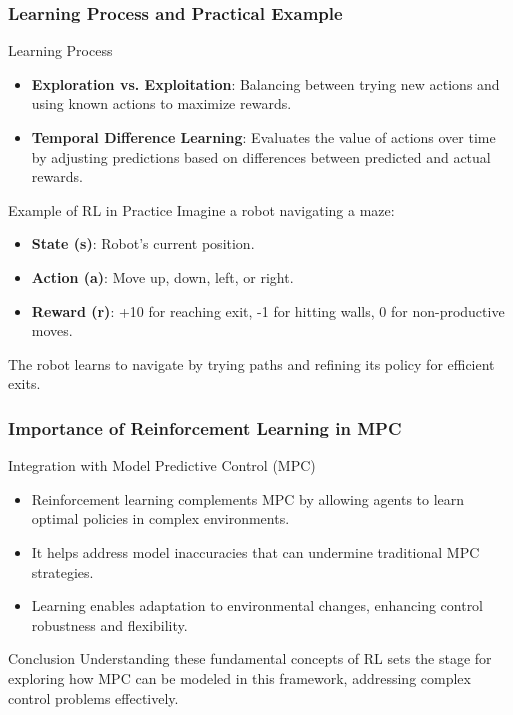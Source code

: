 \documentclass[aspectratio=169]{beamer}
\begin{document}
\begin{frame}[fragile]
    \frametitle{Learning Process and Practical Example}
    \begin{block}{Learning Process}
        \begin{itemize}
            \item \textbf{Exploration vs. Exploitation}: Balancing between trying new actions and using known actions to maximize rewards.
            \item \textbf{Temporal Difference Learning}: Evaluates the value of actions over time by adjusting predictions based on differences between predicted and actual rewards.
        \end{itemize}
    \end{block}

    \begin{block}{Example of RL in Practice}
        Imagine a robot navigating a maze:
        \begin{itemize}
            \item \textbf{State (s)}: Robot's current position.
            \item \textbf{Action (a)}: Move up, down, left, or right.
            \item \textbf{Reward (r)}: +10 for reaching exit, -1 for hitting walls, 0 for non-productive moves.
        \end{itemize}
        The robot learns to navigate by trying paths and refining its policy for efficient exits.
    \end{block}
\end{frame}

\begin{frame}[fragile]
    \frametitle{Importance of Reinforcement Learning in MPC}
    \begin{block}{Integration with Model Predictive Control (MPC)}
        \begin{itemize}
            \item Reinforcement learning complements MPC by allowing agents to learn optimal policies in complex environments.
            \item It helps address model inaccuracies that can undermine traditional MPC strategies.
            \item Learning enables adaptation to environmental changes, enhancing control robustness and flexibility.
        \end{itemize}
    \end{block}

    \begin{block}{Conclusion}
        Understanding these fundamental concepts of RL sets the stage for exploring how MPC can be modeled in this framework, addressing complex control problems effectively.
    \end{block}
\end{frame}
\end{document}

